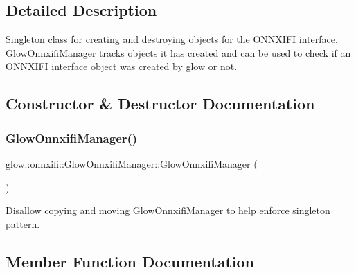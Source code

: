 \subsection{Detailed Description}
Singleton class for creating and destroying objects for the O\+N\+N\+X\+I\+FI interface. \hyperlink{classglow_1_1onnxifi_1_1_glow_onnxifi_manager}{Glow\+Onnxifi\+Manager} tracks objects it has created and can be used to check if an O\+N\+N\+X\+I\+FI interface object was created by glow or not. 

\subsection{Constructor \& Destructor Documentation}
\mbox{\label{classglow_1_1onnxifi_1_1_glow_onnxifi_manager_a7d0eee5569b3f09ab0c26d551a5d069d}} 
\subsubsection{\texorpdfstring{Glow\+Onnxifi\+Manager()}{GlowOnnxifiManager()}}
{\footnotesize\ttfamily glow\+::onnxifi\+::\+Glow\+Onnxifi\+Manager\+::\+Glow\+Onnxifi\+Manager (\begin{DoxyParamCaption}\item[{const \hyperlink{classglow_1_1onnxifi_1_1_glow_onnxifi_manager}{Glow\+Onnxifi\+Manager} \&}]{ }\end{DoxyParamCaption})\hspace{0.3cm}{\ttfamily [delete]}}

Disallow copying and moving \hyperlink{classglow_1_1onnxifi_1_1_glow_onnxifi_manager}{Glow\+Onnxifi\+Manager} to help enforce singleton pattern. 

\subsection{Member Function Documentation}
\mbox{\label{classglow_1_1onnxifi_1_1_glow_onnxifi_manager_ad637fc5474d8a157aee9b44c0533e3a1}} 
